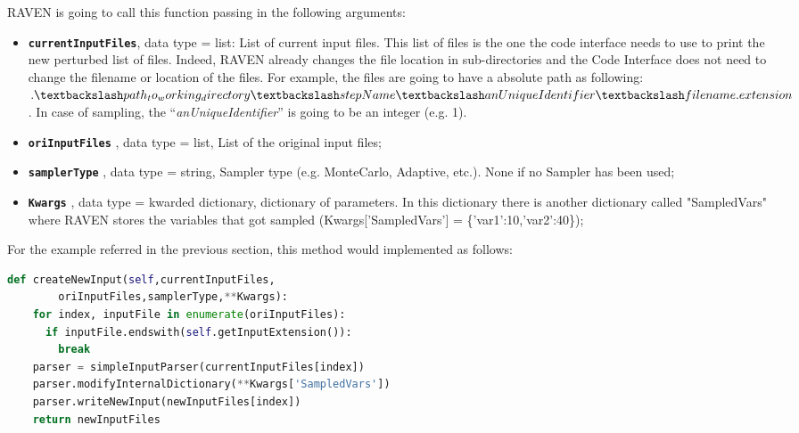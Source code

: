 RAVEN is going to call this function passing in the following arguments:
\begin{itemize}
  \item \textbf{\texttt{currentInputFiles}}, data type = list: List of current
              input files. This list of files is the one the code interface needs to use to print the new perturbed list of files.
              Indeed, RAVEN already changes the file location in sub-directories and the Code Interface does not need to
              change the filename or location of the files. For example, the files are going to have a absolute path as following:
              $.\textbackslash path_to_working_directory\textbackslash stepName\textbackslash anUniqueIdentifier\textbackslash filename.extension$. In case of sampling, the 
              ``\textit{anUniqueIdentifier}'' is going to be an integer (e.g. 1).
  \item \textbf{\texttt{oriInputFiles}} , data type = list, List of the original input files;
  \item  \textbf{\texttt{samplerType}} , data type = string, Sampler type (e.g. MonteCarlo,
               Adaptive, etc.). \nb None if no Sampler has been used;
  \item  \textbf{\texttt{Kwargs}} , data type = kwarded dictionary, dictionary of parameters.
               In this dictionary there is another dictionary
               called "SampledVars" where RAVEN stores the
               variables that got sampled
               (Kwargs['SampledVars'] = \{'var1':10,'var2':40\});
\end{itemize}
For the example referred in the previous section, this method would implemented as follows:
\newline
\begin{lstlisting}[language=python]
  def createNewInput(self,currentInputFiles,
        oriInputFiles,samplerType,**Kwargs):
    for index, inputFile in enumerate(oriInputFiles):
      if inputFile.endswith(self.getInputExtension()):
        break
    parser = simpleInputParser(currentInputFiles[index])
    parser.modifyInternalDictionary(**Kwargs['SampledVars'])
    parser.writeNewInput(newInputFiles[index])
    return newInputFiles
\end{lstlisting}


